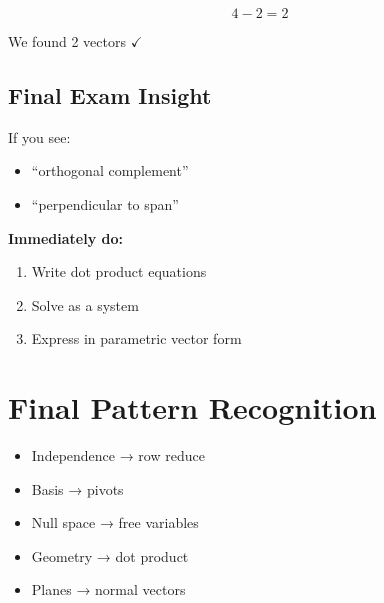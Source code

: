 \documentclass[11pt]{article}
\begin{document}
\[
4 - 2 = 2
\]

We found 2 vectors $\checkmark$

\hrulefill

\subsection*{Final Exam Insight}

If you see:
\begin{itemize}
    \item ``orthogonal complement''
    \item ``perpendicular to span''
\end{itemize}

\textbf{Immediately do:}
\begin{enumerate}
    \item Write dot product equations
    \item Solve as a system
    \item Express in parametric vector form
\end{enumerate}

\hrulefill

\section*{Final Pattern Recognition}

\begin{itemize}
    \item Independence → row reduce
    \item Basis → pivots
    \item Null space → free variables
    \item Geometry → dot product
    \item Planes → normal vectors
\end{itemize}
\end{document}
